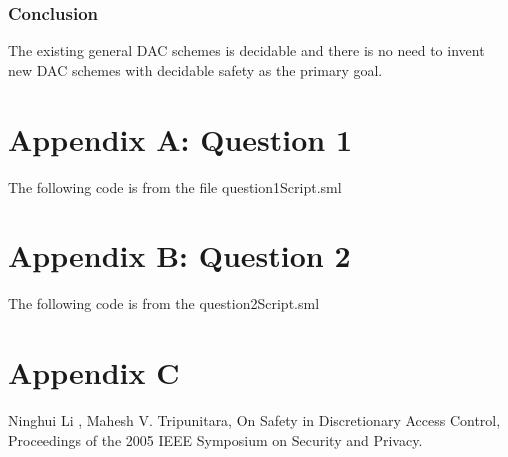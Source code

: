\documentclass{report}
\begin{document}
\subsection{Conclusion}
\label{sec:conclusion-3}
The existing general DAC schemes is decidable and there is no need to invent new
DAC schemes with decidable safety as the primary goal.


\chapter{Appendix A: Question 1}
\label{cha:appendix-a:chapter13}

The following code is from the file question1Script.sml


\chapter{Appendix B: Question 2 }
\label{cha:appendix-a:chapter13b}

The following code is from the question2Script.sml


\chapter{Appendix C}
\label{cha:appendix-a:chapter13b}
Ninghui Li , Mahesh V. Tripunitara, On Safety in Discretionary Access Control, Proceedings of the 2005 IEEE Symposium on Security and Privacy.
\end{document}
